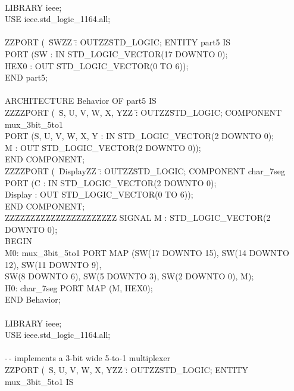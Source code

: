 \documentclass[psfig,10pt,fullpage]{article}
\begin{document}
~\\
\begin{center}
\begin{minipage}[t]{12.5 cm}
\begin{tabbing}
LIBRARY ieee;\\
USE ieee.std\_logic\_1164.all;\\
~\\
ZZ\=PORT (~\=SWZZ \=: OUTZZ\=STD\_LOGIC;\kill
ENTITY part5 IS \\
\>PORT (\>SW \>: IN \>STD\_LOGIC\_VECTOR(17 DOWNTO 0);\\
\>\>HEX0	\>: OUT \>STD\_LOGIC\_VECTOR(0 TO 6));\\
END part5;\\
~\\
ARCHITECTURE Behavior OF part5 IS\\
ZZ\=ZZ\=PORT (~\=S, U, V, W, X, YZZ \=: OUTZZ\=STD\_LOGIC;\kill
\>COMPONENT mux\_3bit\_5to1\\
\>\>PORT (\>S, U, V, W, X, Y	\>: IN \>STD\_LOGIC\_VECTOR(2 DOWNTO 0);\\
\>\>\>M \>: OUT \>STD\_LOGIC\_VECTOR(2 DOWNTO 0));\\
\>END COMPONENT;\\
ZZ\=ZZ\=PORT (~\=DisplayZZ \=: OUTZZ\=STD\_LOGIC;\kill
\>COMPONENT char\_7seg\\
\>\>PORT (\>C \>: IN	\>STD\_LOGIC\_VECTOR(2 DOWNTO 0);\\
\>\>\>Display \>: OUT \>STD\_LOGIC\_VECTOR(0 TO 6));\\
\>END COMPONENT;\\
ZZ\=ZZ\=ZZ\=ZZ\=ZZ\=ZZ\=ZZ\=ZZ\=ZZ\=ZZ\=ZZ\kill
\>SIGNAL M : STD\_LOGIC\_VECTOR(2 DOWNTO 0);\\
BEGIN\\
\>M0: mux\_3bit\_5to1 PORT MAP (SW(17 DOWNTO 15), SW(14 DOWNTO 12), SW(11 DOWNTO 9),\\
\>\>SW(8 DOWNTO 6), SW(5 DOWNTO 3), SW(2 DOWNTO 0), M);\\
\>H0: char\_7seg PORT MAP (M, HEX0);\\
END Behavior;\\
~\\
LIBRARY ieee;\\
USE ieee.std\_logic\_1164.all;\\
~\\
-\,- implements a 3-bit wide 5-to-1 multiplexer\\
ZZ\=PORT (~\=S, U, V, W, X, YZZ \=: OUTZZ\=STD\_LOGIC;\kill
ENTITY mux\_3bit\_5to1 IS\\

\end{tabbing}
\end{minipage}
\end{center}
\end{document}
